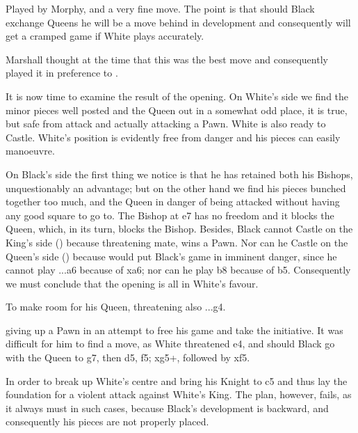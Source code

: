 \documentclass[10pt,twoside]{article}
\begin{document}
Played by Morphy, and a very fine move. The point is that should Black exchange Queens he will be a move behind in development and consequently will get a cramped game if White plays accurately.


Marshall thought at the time that this was the best move and consequently played it in preference to .


\board

It is now time to examine the result of the opening. On White's side we find the minor pieces well posted and the Queen out in a somewhat odd place, it is true, but safe from attack and actually attacking a Pawn. White is also ready to Castle. White's position is evidently free from danger and his pieces can easily manoeuvre.

On Black's side the first thing we notice is that he has retained both his Bishops, unquestionably an advantage; but on the other hand we find his pieces bunched together too much, and the Queen in danger of being attacked without having any good square to go to. The Bishop at e7 has no freedom and it blocks the Queen, which, in its turn, blocks the Bishop. Besides, Black cannot Castle on the King's side () because  threatening mate, wins a Pawn. Nor can he Castle on the Queen's side () because  would put Black's game in imminent danger, since he cannot play ...a6 because of \figB xa6; nor can he play \figK b8 because of \figN b5. Consequently we must conclude that the opening is all in White's favour.


To make room for his Queen, threatening also ...g4.


giving up a Pawn in an attempt to free his game and take the initiative. It was difficult for him to find a move, as White threatened \figN e4, and should Black go with the Queen to g7, then d5, \figB f5; \figN xg5+, followed by \figB xf5.


In order to break up White's centre and bring his Knight to c5 and thus lay the foundation for a violent attack against White's King. The plan, however, fails, as it always must in such cases, because Black's development is backward, and consequently his pieces are not properly placed.
\end{document}
